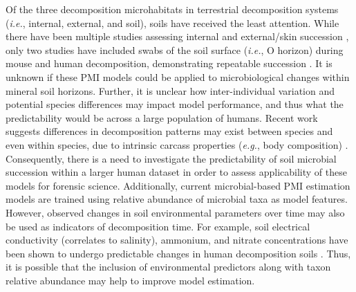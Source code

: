 \documentclass[
  10pt,
  letterpaper,
]{article}
\begin{document}
Of the three decomposition microhabitats in terrestrial decomposition
systems (\emph{i.e.}, internal, external, and soil), soils have received
the least attention. While there have been multiple studies assessing
internal and external/skin succession
\citep{pechal_potential_2014, johnson_machine_2016, metcalf_microbial_2016, liu_predicting_2020, hu_predicting_2021, belk_microbiome_2018},
only two studies have included swabs of the soil surface (\emph{i.e.}, O
horizon) during mouse and human decomposition, demonstrating repeatable
succession \citep{belk_microbiome_2018, burcham_conserved_2024}. It is
unknown if these PMI models could be applied to microbiological changes
within mineral soil horizons. Further, it is unclear how
inter-individual variation and potential species differences may impact
model performance, and thus what the predictability would be across a
large population of humans. Recent work suggests differences in
decomposition patterns may exist between species
\citep{dautartas_differential_2018, debruyn_comparative_2021} and even
within species, due to intrinsic carcass properties (\emph{e.g.}, body
composition) \citep{mason_body_2022}. Consequently, there is a need to
investigate the predictability of soil microbial succession within a
larger human dataset in order to assess applicability of these models
for forensic science. Additionally, current microbial-based PMI
estimation models are trained using relative abundance of microbial taxa
as model features. However, observed changes in soil environmental
parameters over time may also be used as indicators of decomposition
time. For example, soil electrical conductivity (correlates to
salinity), ammonium, and nitrate concentrations have been shown to
undergo predictable changes in human decomposition soils
\citep{aitkenhead-peterson_mapping_2012, fancher_evaluation_2017, taylor_high_2020}.
Thus, it is possible that the inclusion of environmental predictors
along with taxon relative abundance may help to improve model
estimation.
\end{document}
